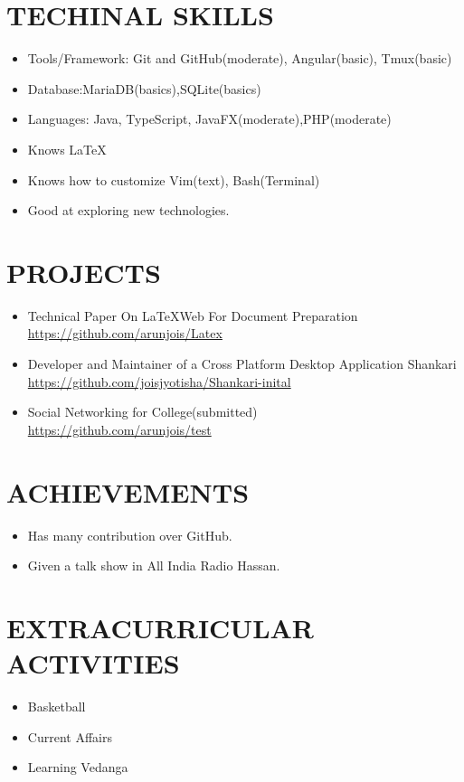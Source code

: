 \documentclass{res}
\begin{document}
\begin{resume}
		\section{TECHINAL SKILLS}
		\begin{itemize}
			\item Tools/Framework: Git and GitHub(moderate),  Angular(basic), Tmux(basic)
			\item Database:MariaDB(basics),SQLite(basics)
			\item Languages: Java, TypeScript, JavaFX(moderate),PHP(moderate) 
			\item Knows \LaTeX
			\item Knows how to customize Vim(text), Bash(Terminal)
			\item Good at exploring new technologies.
		\end{itemize}        
		
		
		\section{PROJECTS}
		\begin{itemize}
			\item Technical Paper On \LaTeX Web For Document Preparation \\
			\href {https://github.com/arunjois/Latex}{https://github.com/arunjois/Latex}
			
			\item Developer and Maintainer of a Cross Platform Desktop Application Shankari\\
			\href {https://github.com/joisjyotisha/Shankari-inital}{https://github.com/joisjyotisha/Shankari-inital}
			
			\item Social Networking for College(submitted) \\
			\href{https://github.com/arunjois/test}{https://github.com/arunjois/test}
		\end{itemize}          
		\section{ACHIEVEMENTS}
		\begin{itemize}
			\item Has many contribution over GitHub.
			\item Given a talk show in All India Radio Hassan. 
		\end{itemize} 
		\section{EXTRACURRICULAR ACTIVITIES}
		\begin{itemize}
			\item Basketball
			\item Current Affairs
			\item Learning Vedanga
		\end{itemize}       
		
	\end{resume}
\end{document}
